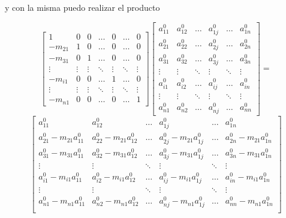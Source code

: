 y con la misma puedo realizar el producto 

\[
\begin{bmatrix}
1 & 0 & 0 & \ldots & 0 & \ldots & 0 \\
-m_{21} & 1 & 0 & \ldots & 0 & \ldots & 0 \\
-m_{31} & 0 & 1 & \ldots & 0 & \ldots & 0 \\
\vdots & \vdots & \vdots & \ddots & \vdots & \ddots & \vdots \\
-m_{i1} & 0 & 0 & \ldots & 1 & \ldots & 0 \\
\vdots & \vdots & \vdots & \ddots & \vdots & \ddots & \vdots \\
-m_{n1} & 0 & 0 & \ldots & 0 & \ldots & 1 
\end{bmatrix}
\begin{bmatrix}
a_{11}^{0} & a_{12}^{0} & \ldots & a_{1j}^{0} & \ldots &a_{1n}^{0} \\
a_{21}^{0} & a_{22}^{0} & \ldots & a_{2j}^{0} & \ldots &a_{2n}^{0} \\
a_{31}^{0} & a_{32}^{0} & \ldots & a_{3j}^{0} & \ldots &a_{3n}^{0} \\
\vdots & \vdots & \ddots & \vdots & \ddots & \vdots \\
a_{i1}^{0} & a_{i2}^{0} & \ldots & a_{ij}^{0} & \ldots &a_{in}^{0} \\
\vdots & \vdots & \ddots & \vdots & \ddots & \vdots \\
a_{n1}^{0} & a_{n2}^{0} & \ldots & a_{nj}^{0} & \ldots &a_{nn}^{0}
\end{bmatrix}
=
\]
\[
\begin{bmatrix}
a_{11}^{0} & a_{12}^{0} & \ldots & a_{1j}^{0} & \ldots &a_{1n}^{0} \\
a_{21}^{0} -m_{21}a_{11}^{0} & a_{22}^{0}-m_{21}a_{12}^{0} & \ldots & a_{2j}^{0}-m_{21}a_{1j}^{0} & \ldots &a_{2n}^{0}-m_{21}a_{1n}^{0} \\
a_{31}^{0} -m_{31}a_{11}^{0} & a_{32}^{0}-m_{31}a_{12}^{0} & \ldots & a_{3j}^{0}-m_{31}a_{1j}^{0} & \ldots &a_{3n}^{0}-m_{31}a_{1n}^{0} \\
\vdots & \vdots & \ddots & \vdots & \ddots & \vdots \\
a_{i1}^{0} -m_{i1}a_{11}^{0} & a_{i2}^{0}-m_{i1}a_{12}^{0} & \ldots & a_{ij}^{0}-m_{i1}a_{1j}^{0} & \ldots &a_{in}^{0}-m_{i1}a_{1n}^{0} \\
\vdots & \vdots & \ddots & \vdots & \ddots & \vdots \\
a_{n1}^{0} -m_{n1}a_{11}^{0} & a_{n2}^{0}-m_{n1}a_{12}^{0} & \ldots & a_{nj}^{0}-m_{n1}a_{1j}^{0} & \ldots &a_{nn}^{0}-m_{n1}a_{1n}^{0} \\
\end{bmatrix}
\]

